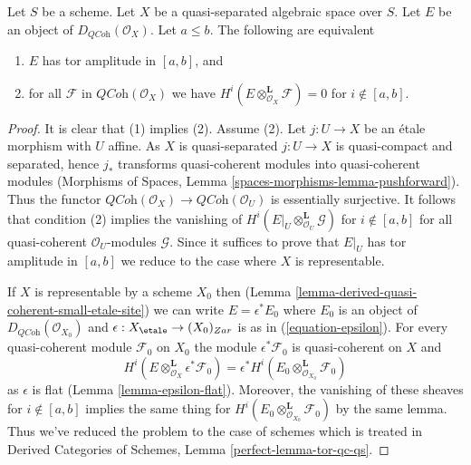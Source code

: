 \begin{lemma}
\label{lemma-tor-qc-qs}
Let $S$ be a scheme. Let $X$ be a quasi-separated algebraic space over $S$.
Let $E$ be an object of $D_{\textit{QCoh}}(\mathcal{O}_X)$. Let $a \leq b$.
The following are equivalent
\begin{enumerate}
\item $E$ has tor amplitude in $[a, b]$, and
\item for all $\mathcal{F}$ in $\textit{QCoh}(\mathcal{O}_X)$
we have $H^i(E \otimes_{\mathcal{O}_X}^\mathbf{L} \mathcal{F}) = 0$
for $i \not \in [a, b]$.
\end{enumerate}
\end{lemma}

\begin{proof}
It is clear that (1) implies (2). Assume (2). Let $j : U \to X$ be
an \'etale morphism with $U$ affine. As $X$ is quasi-separated $j : U \to X$
is quasi-compact and separated, hence $j_*$ transforms quasi-coherent
modules into quasi-coherent modules (Morphisms of Spaces, Lemma
\ref{spaces-morphisms-lemma-pushforward}).
Thus the functor
$\textit{QCoh}(\mathcal{O}_X) \to \textit{QCoh}(\mathcal{O}_U)$
is essentially surjective. It follows that condition (2)
implies the vanishing of
$H^i(E|_U \otimes_{\mathcal{O}_U}^\mathbf{L} \mathcal{G})$
for $i \not \in [a, b]$ for all quasi-coherent $\mathcal{O}_U$-modules
$\mathcal{G}$. Since it suffices to prove that $E|_U$ has tor amplitude
in $[a, b]$ we reduce to the case where $X$ is representable.

\medskip\noindent
If $X$ is representable by a scheme $X_0$ then
(Lemma \ref{lemma-derived-quasi-coherent-small-etale-site})
we can write $E = \epsilon^*E_0$ where $E_0$ is an object of
$D_{\textit{QCoh}}(\mathcal{O}_{X_0})$ and
$\epsilon : X_\etale \to (X_0)_{Zar}$ is as in
(\ref{equation-epsilon}). For every quasi-coherent module
$\mathcal{F}_0$ on $X_0$ the module $\epsilon^*\mathcal{F}_0$
is quasi-coherent on $X$ and
$$
H^i(E \otimes_{\mathcal{O}_X}^\mathbf{L} \epsilon^*\mathcal{F}_0)
=
\epsilon^*H^i(E_0 \otimes_{\mathcal{O}_{X_0}}^\mathbf{L} \mathcal{F}_0)
$$
as $\epsilon$ is flat (Lemma \ref{lemma-epsilon-flat}).
Moreover, the vanishing of these sheaves for $i \not \in [a, b]$
implies the same thing for
$H^i(E_0 \otimes_{\mathcal{O}_{X_0}}^\mathbf{L} \mathcal{F}_0)$
by the same lemma. Thus we've reduced the problem to the case
of schemes which is treated in
Derived Categories of Schemes, Lemma \ref{perfect-lemma-tor-qc-qs}.
\end{proof}









